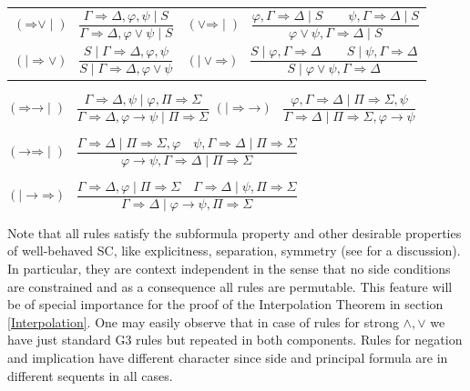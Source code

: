 \documentclass[10pt,a4paper]{article}
\theoremstyle{definition}
\newcommand{\3}{\vspace{.3in}}
\newcommand{\2}{\vspace{.2in}}
\newcommand{\1}{\vspace{.1in}}
\newcommand{\5}{\vspace{.05in}}
\begin{document}
\noindent\begin{tabular}{ll}	
	
 $(\mathord{\Rightarrow}\mathord{\vee}\mid)$ \ $\dfrac{\Gamma
		\Rightarrow \Delta, \varphi,\psi \mid S} {\Gamma\Rightarrow \Delta,
		\varphi\vee\psi \mid S}$ &
	 $(\mathord{\vee}\mathord{\Rightarrow}\mid)$ \ $\dfrac{\varphi, \Gamma
		\Rightarrow \Delta \mid S \qquad \psi, \Gamma
		\Rightarrow \Delta \mid S}{\varphi\vee\psi,
		\Gamma\Rightarrow \Delta \mid S}$\\[16pt]
	
	
	 $(\mathord{\mid\Rightarrow}\mathord{\vee})$ \ $\dfrac{S\mid\Gamma
		\Rightarrow \Delta, \varphi,\psi } {S\mid\Gamma\Rightarrow \Delta,
		\varphi\vee\psi}$ &
 $(\mathord{\mid\vee}\mathord{\Rightarrow})$ \ $\dfrac{S\mid\varphi, \Gamma
		\Rightarrow \Delta \qquad S\mid \psi, \Gamma
		\Rightarrow \Delta }{S\mid\varphi\vee\psi,
		\Gamma \Rightarrow \Delta}$\\[16pt]	
\end{tabular}
\begin{flushleft}
	$(\mathord{\Rightarrow}\mathord{\rightarrow}\mid)$ \, $\dfrac{\Gamma
		\Rightarrow \Delta, \psi \mid \varphi, \Pi\Rightarrow\Sigma}{\Gamma\Rightarrow\Delta, \varphi\rightarrow\psi \mid \Pi\Rightarrow\Sigma}$\qquad
	$(\mathord{\mid\Rightarrow}\mathord{\rightarrow})$ \, $\dfrac{\varphi, \Gamma
		\Rightarrow \Delta \mid\Pi\Rightarrow\Sigma, \psi}{\Gamma\Rightarrow\Delta \mid \Pi\Rightarrow\Sigma, \varphi\rightarrow\psi}$	
\end{flushleft}
\begin{flushleft}
	$(\mathord{\rightarrow}\mathord{\Rightarrow}\mid)$ \, $\dfrac{\Gamma
		\Rightarrow \Delta \mid \Pi\Rightarrow\Sigma, \varphi \quad\psi, \Gamma\Rightarrow\Delta \mid
		\Pi \Rightarrow \Sigma } {\varphi\rightarrow\psi, \Gamma
		\Rightarrow \Delta \mid \Pi\Rightarrow\Sigma}$
\end{flushleft}
\begin{flushleft}
$(\mathord{\mid\rightarrow}\mathord{\Rightarrow})$ \, $\dfrac{\Gamma
	\Rightarrow \Delta, \varphi \mid \Pi\Rightarrow\Sigma \quad \Gamma\Rightarrow\Delta \mid \psi,
	\Pi \Rightarrow \Sigma } {\Gamma
	\Rightarrow \Delta \mid \varphi\rightarrow\psi, \Pi\Rightarrow\Sigma}$	
\end{flushleft}

Note that all rules satisfy the subformula property and other desirable properties of well-behaved SC, like explicitness, separation, symmetry (see \cite{Poggiolesi,Wansing, Indrzejczak2} for a discussion). In particular, they are context independent in the sense that no side conditions are constrained and as a consequence all rules are permutable. This feature will be of special importance for the proof of the Interpolation Theorem in section \ref{Interpolation}. One may easily observe that in case of rules for strong $\wedge, \vee$ we have just standard G3 rules but repeated in both components. Rules for negation and implication have different character since side and principal formula are in different sequents in all cases.
\end{document}
